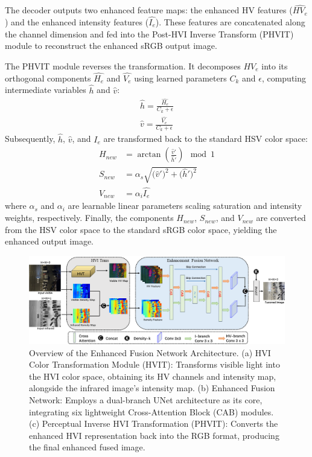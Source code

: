 \documentclass[journal]{IEEEtran}
\begin{document}
The decoder outputs two enhanced feature maps: the enhanced HV features ($\hat{HV_e}$) and the enhanced intensity features ($\hat{I_e}$). These features are concatenated along the channel dimension and fed into the Post-HVI Inverse Transform (PHVIT) module to reconstruct the enhanced sRGB output image.

The PHVIT module reverses the transformation. It decomposes $\hat{HV_e}$ into its orthogonal components $\hat{H_e}$ and $\hat{V_e}$ using learned parameters $C_k$ and $\epsilon$, computing intermediate variables $\hat{h}$ and $\hat{v}$:
\begin{equation}
\begin{aligned}
\hat{h}=\frac{\hat{H_e}}{C_k+\epsilon} \\
\hat{v}=\frac{\hat{V_e}}{C_k+\epsilon}
\end{aligned}
\end{equation}
Subsequently, $\hat{h}$, $\hat{v}$, and $\hat{I_e}$ are transformed back to the standard HSV color space:
\begin{equation}
\begin{aligned}
H_{new} &= \arctan(\frac{{\hat{v}}'}{\hat{h}'}) \mod 1  \\
S_{new} &= \alpha_s \sqrt{{(\hat{v}}')^{2} + {(\hat{h}}')^{2}} \\
V_{new} &= \alpha_{i} \hat{I_e}
\end{aligned}
\end{equation}
where $\alpha_s$ and $\alpha_{i}$ are learnable linear parameters scaling saturation and intensity weights, respectively. Finally, the components $H_{new}$, $S_{new}$, and $V_{new}$ are converted from the HSV color space to the standard sRGB color space, yielding the enhanced output image.

\begin{figure}[!t]
    \centering
    \includegraphics[width=1.0\textwidth]{chapter and images/enhance_fusion.png}
    \caption{Overview of the Enhanced Fusion Network Architecture. (a) HVI Color Transformation Module (HVIT): Transforms visible light into the HVI color space, obtaining its HV channels and intensity map, alongside the infrared image's intensity map. (b) Enhanced Fusion Network: Employs a dual-branch UNet architecture as its core, integrating six lightweight Cross-Attention Block (CAB) modules. (c) Perceptual Inverse HVI Transformation (PHVIT): Converts the enhanced HVI representation back into the RGB format, producing the final enhanced fused image.}
    \label{fig:pipeline}
\end{figure}
\end{document}
